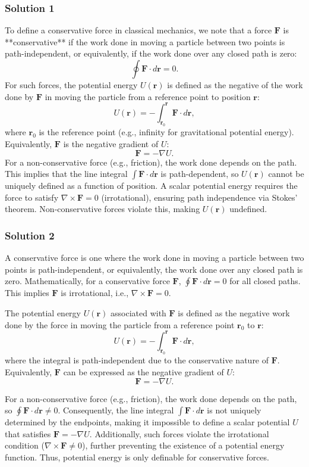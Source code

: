 \documentclass{article}
\begin{document}
\subsubsection{Solution 1}
To define a conservative force in classical mechanics, we note that a force $\mathbf{F}$ is **conservative** if the work done in moving a particle between two points is path-independent, or equivalently, if the work done over any closed path is zero:
\[
\oint \mathbf{F} \cdot d\mathbf{r} = 0.
\]
For such forces, the potential energy $U(\mathbf{r})$ is defined as the negative of the work done by $\mathbf{F}$ in moving the particle from a reference point to position $\mathbf{r}$:
\[
U(\mathbf{r}) = -\int_{\mathbf{r}_0}^{\mathbf{r}} \mathbf{F} \cdot d\mathbf{r},
\]
where $\mathbf{r}_0$ is the reference point (e.g., infinity for gravitational potential energy). Equivalently, $\mathbf{F}$ is the negative gradient of $U$:
\[
\mathbf{F} = -\nabla U.
\]
For a non-conservative force (e.g., friction), the work done depends on the path. This implies that the line integral $\int \mathbf{F} \cdot d\mathbf{r}$ is path-dependent, so $U(\mathbf{r})$ cannot be uniquely defined as a function of position. A scalar potential energy requires the force to satisfy $\nabla \times \mathbf{F} = 0$ (irrotational), ensuring path independence via Stokes' theorem. Non-conservative forces violate this, making $U(\mathbf{r})$ undefined.

\subsubsection{Solution 2}
A conservative force is one where the work done in moving a particle between two points is path-independent, or equivalently, the work done over any closed path is zero. Mathematically, for a conservative force $\mathbf{F}$, $\oint \mathbf{F} \cdot d\mathbf{r} = 0$ for all closed paths. This implies $\mathbf{F}$ is irrotational, i.e., $\nabla \times \mathbf{F} = 0$.

The potential energy $U(\mathbf{r})$ associated with $\mathbf{F}$ is defined as the negative work done by the force in moving the particle from a reference point $\mathbf{r}_0$ to $\mathbf{r}$:  
\[
U(\mathbf{r}) = -\int_{\mathbf{r}_0}^{\mathbf{r}} \mathbf{F} \cdot d\mathbf{r},
\]  
where the integral is path-independent due to the conservative nature of $\mathbf{F}$. Equivalently, $\mathbf{F}$ can be expressed as the negative gradient of $U$:  
\[
\mathbf{F} = -\nabla U.
\]

For a non-conservative force (e.g., friction), the work done depends on the path, so $\oint \mathbf{F} \cdot d\mathbf{r} \neq 0$. Consequently, the line integral $\int \mathbf{F} \cdot d\mathbf{r}$ is not uniquely determined by the endpoints, making it impossible to define a scalar potential $U$ that satisfies $\mathbf{F} = -\nabla U$. Additionally, such forces violate the irrotational condition ($\nabla \times \mathbf{F} \neq 0$), further preventing the existence of a potential energy function. Thus, potential energy is only definable for conservative forces.
\end{document}
